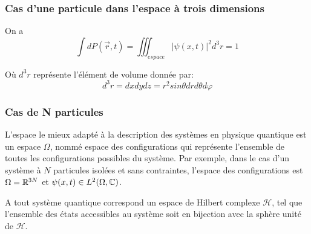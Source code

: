 \subsubsection{Cas d’une particule dans l’espace à trois dimensions}
On a 
\begin{equation}
\int dP(\vec{r},t)=\iiint_{espace}|\psi(x,t)|^2d^3r=1
\end{equation}

Où $d^3r$ représente l'élément de volume donnée par: $$d^3r=dxdydz=r^2sin\theta dr d\theta d\varphi$$

\subsubsection{Cas de N particules}
L’espace le mieux adapté à la description des systèmes en physique quantique est un espace $\Omega$, nommé espace des configurations qui représente l’ensemble de toutes les configurations possibles du système. Par exemple, dans le cas d’un système à $N$ particules isolées et sans contraintes, l’espace des configurations est $\Omega = \mathbb R^{3N}$ et $\psi(x,t) \in L^2(\Omega, \mathbb C)$.

\begin{Post}
	A tout système quantique correspond un espace de Hilbert complexe $\mathcal{H}$, tel que l’ensemble des états accessibles au système soit en bijection avec la sphère unité de $\mathcal{H}$.
\end{Post}

